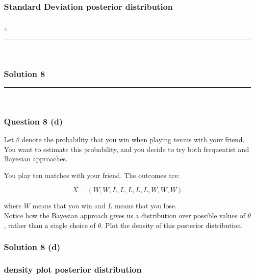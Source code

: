 \documentclass{article}
\begin{document}
\subsubsection*{Standard Deviation posterior distribution}


\subsubsection*{\normalfont}{$\therefore$ } \\

\noindent\rule{\textwidth}{0.4pt}\\

\newpage

\subsubsection*{Solution 8}
\noindent\rule{\textwidth}{0.4pt}\\
\subsubsection*{Question 8 (d)}
\begin{flushleft}
Let $\theta$ denote the probability that you win when playing tennis with your friend. You want to estimate this probability, and you decide to try both frequentist and Bayesian approaches.

You play ten matches with your friend. The outcomes are:
\end{flushleft}
$$X = (W, W, L, L, L, L, L, W, W, W)$$

\begin{flushleft}
where $W$ means that you win and $L$ means that you lose.\\

 Notice how the Bayesian approach gives us a distribution over possible values of $\theta$, rather than a single choice of $\theta$. Plot the density of this posterior distribution.
\end{flushleft}

\subsubsection*{Solution 8 (d)}


\subsubsection*{density plot posterior distribution}
\end{document}
